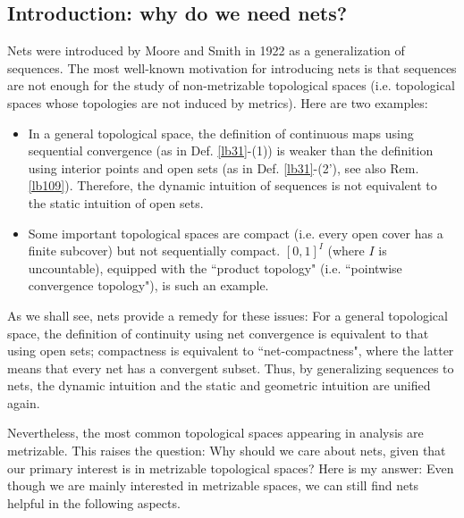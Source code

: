 \documentclass[12pt,b5paper,notitlepage]{article}
\theoremstyle{definition}
\theoremstyle{plain}
\numberwithin{equation}{section}
\begin{document}
\subsection{Introduction: why do we need nets?}



Nets were introduced by Moore and Smith in 1922 as a generalization of sequences. The most well-known motivation for introducing nets is that sequences are not enough for the study of non-metrizable topological spaces (i.e. topological spaces whose topologies are not induced by metrics). Here are two examples:
\begin{itemize}
\item In a general topological space, the definition of continuous maps using sequential convergence (as in Def. \ref{lb31}-(1)) is weaker than the definition using interior points and open sets (as in Def. \ref{lb31}-(2'), see also Rem. \ref{lb109}). Therefore, the dynamic intuition of sequences is not equivalent to the static intuition of open sets. 
\item Some important  topological spaces are compact (i.e. every open cover has a finite subcover) but not sequentially compact. $[0,1]^I$ (where $I$ is uncountable), equipped with the ``product topology" (i.e. ``pointwise convergence topology"), is such an example. 
\end{itemize}
As we shall see, nets provide a remedy for these issues: For a general topological space, the definition of continuity using net convergence is equivalent to that using open sets; compactness is equivalent to ``net-compactness", where the latter means that every net has a convergent subset. Thus, by generalizing sequences to nets, the dynamic intuition and the static and geometric intuition are unified again.


Nevertheless, the most common topological spaces appearing in analysis are metrizable. This raises the question: Why should we care about nets, given that our primary interest is in metrizable topological spaces? Here is my answer: Even though we are mainly interested in metrizable spaces, we can still find nets helpful in the following aspects. 
\end{document}
